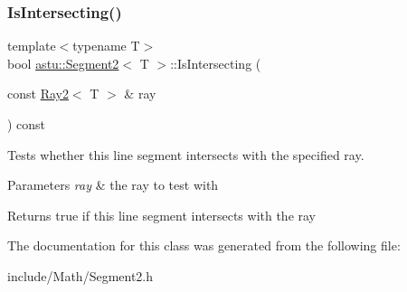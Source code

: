 \subsubsection{\texorpdfstring{Is\+Intersecting()}{IsIntersecting()}\hspace{0.1cm}{\footnotesize\ttfamily [2/2]}}
{\footnotesize\ttfamily template$<$typename T$>$ \\
bool \hyperlink{classastu_1_1Segment2}{astu\+::\+Segment2}$<$ T $>$\+::Is\+Intersecting (\begin{DoxyParamCaption}\item[{const \hyperlink{classastu_1_1Ray2}{Ray2}$<$ T $>$ \&}]{ray }\end{DoxyParamCaption}) const\hspace{0.3cm}{\ttfamily [inline]}}

Tests whether this line segment intersects with the specified ray.


\begin{DoxyParams}{Parameters}
{\em ray} & the ray to test with \\
\hline
\end{DoxyParams}
\begin{DoxyReturn}{Returns}
{\ttfamily true} if this line segment intersects with the ray 
\end{DoxyReturn}


The documentation for this class was generated from the following file\+:\begin{DoxyCompactItemize}
\item 
include/\+Math/Segment2.\+h\end{DoxyCompactItemize}
